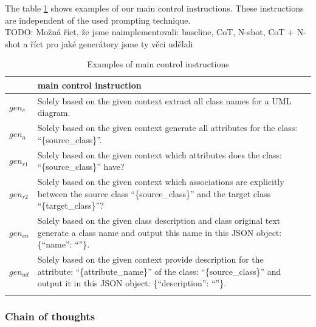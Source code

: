 The table \ref{tab:main-control-instructions} shows examples of our main control instructions. These instructions are independent of the used prompting technique. \\

TODO: Možná říct, že jsme naimplementovali: baseline, CoT, N-shot, CoT + N-shot a říct pro jaké generátory jsme ty věci udělali \\

\begin{table}[!h]
    \scriptsize
    \centering
    \setlength{\tabcolsep}{0.5em}
\begin{tabular}{@{}l>{\raggedright\arraybackslash}p{}>{\raggedright\arraybackslash}p{}@{}}
         & main control instruction \\
    \toprule
    \addlinespace
    
$gen_c$ & Solely based on the given context extract all class names for a UML diagram. \\
\addlinespace

$gen_a$ & Solely based on the given context generate all attributes for the class: ``\{source\_class\}''. \\
\addlinespace

$gen_{r1}$ & Solely based on the given context which attributes does the class: ``\{source\_class\}'' have? \\
\addlinespace

$gen_{r2}$ & Solely based on the given context which associations are explicitly between the source class ``\{source\_class\}'' and the target class ``\{target\_class\}''? \\
\addlinespace

$gen_{cn}$ & Solely based on the given class description and class original text generate a class name and output this name in this JSON object: \{``name'': ``''\}. \\
\addlinespace

$gen_{ad}$ & Solely based on the given context provide description for the attribute: ``\{attribute\_name\}'' of the class: ``\{source\_class\}'' and output it in this JSON object: \{``description'': ``''\}. \\
\addlinespace

	\bottomrule
	\addlinespace
	\end{tabular}
	\caption{Examples of main control instructions}
	\label{tab:main-control-instructions}
\end{table}


\subsubsection{Chain of thoughts}

